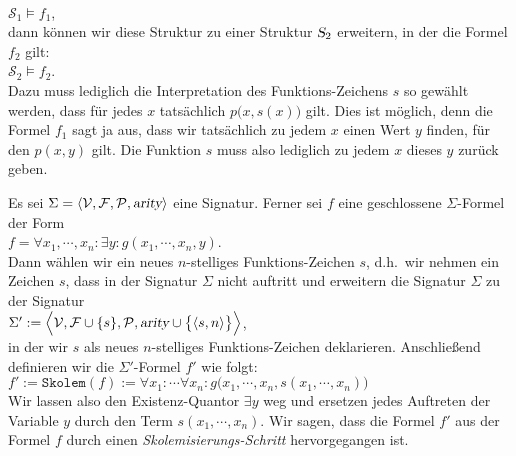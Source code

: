 \\[0.2cm]
\hspace*{1.3cm}
$\mathcal{S}_1 \models f_1$,
\\[0.2cm]
dann k\"{o}nnen wir diese Struktur zu einer Struktur $\textsl{S}_2$ erweitern, in der die
Formel $f_2$ gilt:
\\[0.2cm]
\hspace*{1.3cm}
$\mathcal{S}_2 \models f_2$.
\\[0.2cm]
Dazu muss lediglich die Interpretation des Funktions-Zeichens $s$ so gew\"{a}hlt werden, dass
f\"{u}r jedes $x$ tats\"{a}chlich $p\bigl(x,s(x)\bigr)$ gilt.  Dies ist m\"{o}glich, denn die Formel
$f_1$ sagt ja aus, dass wir tats\"{a}chlich zu jedem $x$ einen Wert $y$ finden, f\"{u}r den
$p(x,y)$ gilt.   Die Funktion $s$ muss also lediglich zu jedem $x$ dieses $y$ zur\"{u}ck geben.



\begin{Definition}
  Es sei $\Sigma = \langle \mathcal{V}, \mathcal{F}, \mathcal{P}, \textsl{arity} \rangle$
  eine Signatur.  Ferner sei $f$ eine geschlossene $\Sigma$-Formel der Form \\[0.2cm]
  \hspace*{1.3cm} 
  $f = \forall x_1, \cdots, x_n \colon \exists y \colon g(x_1, \cdots, x_n, y)$. \\[0.2cm]
  Dann w\"{a}hlen wir ein neues $n$-stelliges Funktions-Zeichen $s$, d.h.~wir nehmen ein Zeichen $s$, dass in
  der Signatur $\Sigma$ nicht auftritt und erweitern die Signatur $\Sigma$ zu der Signatur \\[0.2cm]
  \hspace*{1.3cm} 
  $\Sigma' := \Bigl\langle \mathcal{V}, \mathcal{F} \cup \{s\}, \mathcal{P}, \textsl{arity} \cup \bigl\{\pair(s,n)\bigr\} \Bigr\rangle$, \\[0.2cm]
  in der wir $s$ als neues $n$-stelliges Funktions-Zeichen deklarieren.  Anschlie\ss{}end definieren wir die $\Sigma'$-Formel
  $f'$ wie folgt: \\[0.2cm]
  \hspace*{1.3cm} 
  $f' := \mathtt{Skolem}(f) := 
  \forall x_1 \colon \cdots \forall x_n \colon g\bigl(x_1, \cdots, x_n, s(x_1,\cdots,x_n)\bigr)$
  \\[0.2cm]
  Wir lassen also den Existenz-Quantor $\exists y$ weg und ersetzen jedes Auftreten
  der Variable $y$ durch den Term $s(x_1,\cdots,x_n)$.  Wir sagen, dass die Formel $f'$ aus der Formel $f$
  durch einen {\emph{\color{blue}Skolemisierungs-Schritt}} hervorgegangen ist. 
  \eox
\end{Definition}

